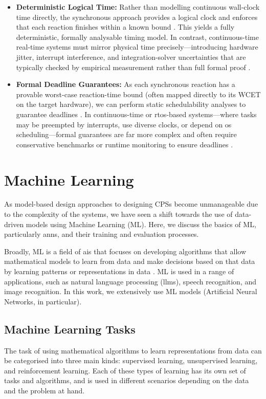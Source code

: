 \begin{itemize}
  \item \textbf{Deterministic Logical Time:} Rather than modelling continuous wall-clock time directly, the synchronous approach provides a logical clock and enforces that each reaction finishes within a known bound \cite{berry_foundations_2000,boussinot_sl_1996}. This yields a fully deterministic, formally analysable timing model. In contrast, continuous-time real-time systems must mirror physical time precisely—introducing hardware jitter, interrupt interference, and integration-solver uncertainties that are typically checked by empirical measurement rather than full formal proof \cite{buttazzo_hard_2011,kopetz_real-time_2011}.
  \item \textbf{Formal Deadline Guarantees:} As each synchronous reaction has a provable worst-case reaction-time bound (often mapped directly to its WCET on the target hardware), we can perform static schedulability analyses to guarantee deadlines \cite{liu_real-time_1973}. In continuous-time or \gls{rtos}-based systems—where tasks may be preempted by interrupts, use diverse clocks, or depend on \gls{os} scheduling—formal guarantees are far more complex and often require conservative benchmarks or runtime monitoring to ensure deadlines \cite{buttazzo_hard_2011}.
\end{itemize}


\section{Machine Learning}
As model-based design approaches to designing CPSs become unmanageable due to the complexity of the systems, we have seen a shift towards the use of data-driven models using Machine Learning (ML). Here, we discuss the basics of ML, particularly \glspl{ann}, and their training and evaluation processes. 

Broadly, ML is a field of \glspl{ai} that focuses on developing algorithms that allow mathematical models to learn from data and make decisions based on that data by learning patterns or representations in data \cite{murphy_machine_2012}. ML is used in a range of applications, such as natural language processing (\glspl{llm}),  speech recognition, and image recognition. In this work, we extensively use ML models (Artificial Neural Networks, in particular).



\subsection{Machine Learning Tasks}
The task of using mathematical algorithms to learn representations from data can be categorised into three main kinds: supervised learning, unsupervised learning, and reinforcement learning. Each of these types of learning has its own set of tasks and algorithms, and is used in different scenarios depending on the data and the problem at hand.

